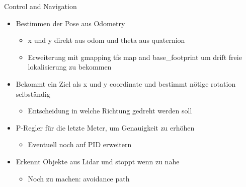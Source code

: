 \begin{frame}{Control and Navigation}

\begin{itemize}
\item
  Bestimmen der Pose aus Odometry

  \begin{itemize}
  \item
    x und y direkt aus odom und theta aus quaternion
  \item
    Erweiterung mit gmapping tfs map and base\_footprint um drift freie
    lokalisierung zu bekommen
  \end{itemize}
\item
  Bekommt ein Ziel als x und y coordinate und bestimmt nötige rotation
  selbständig

  \begin{itemize}
  \tightlist
  \item
    Entscheidung in welche Richtung gedreht werden soll
  \end{itemize}
\item
  P-Regler für die letzte Meter, um Genauigkeit zu erhöhen

  \begin{itemize}
  \tightlist
  \item
    Eventuell noch auf PID erweitern
  \end{itemize}
\item
  Erkennt Objekte aus Lidar und stoppt wenn zu nahe

  \begin{itemize}
  \tightlist
  \item
    Noch zu machen: avoidance path
  \end{itemize}
\end{itemize}

\end{frame}

